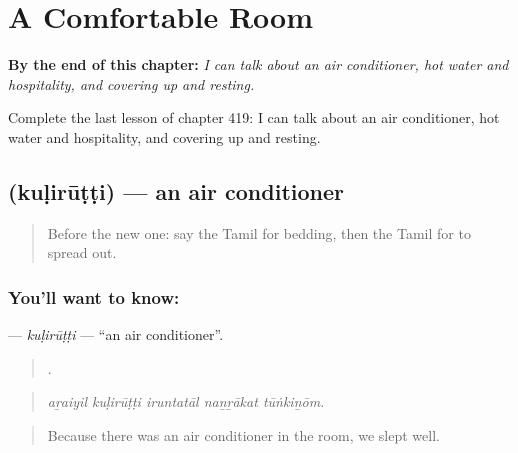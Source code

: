 
\chapter{A Comfortable Room}
\label{ch:ta-a-comfortable-room}

\begin{chapteropening}
\textbf{By the end of this chapter:} \emph{I can talk about an air conditioner, hot water and hospitality, and covering up and resting.}

Complete the last lesson of chapter 419: I can talk about an air conditioner, hot water and hospitality, and covering up and resting.
\end{chapteropening}

\section[\texorpdfstring{\ta{குளிரூட்டி} (kuḷirūṭṭi)}{குளிரூட்டி (kuḷirūṭṭi)}]{ (kuḷirūṭṭi) — an air conditioner}

\label{lesson:TA-C419-kulirutti}



\begin{quote}
Before the new one: say the Tamil for bedding, then the Tamil for to spread out.
\end{quote}

\subsection*{You'll want to know: }
\textbf{} — \emph{kuḷirūṭṭi} — \textquotedblleft{}an air conditioner\textquotedblright{}.

\begin{quote}
    .
\end{quote}

\begin{quote}
\emph{aṟaiyil kuḷirūṭṭi iruntatāl naṉṟākat tūṅkiṉōm.}
\end{quote}

\begin{quote}
Because there was an air conditioner in the room, we slept well.
\end{quote}

